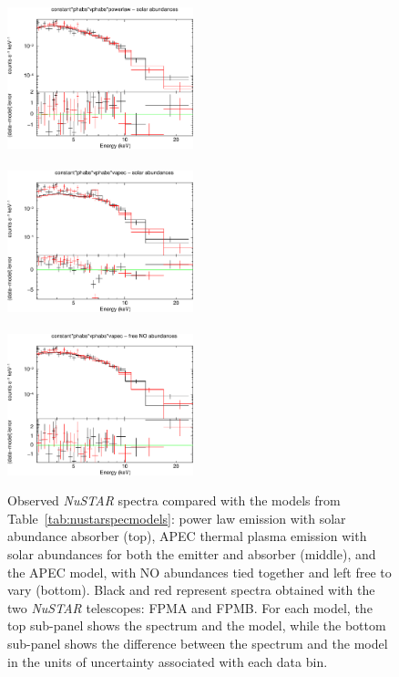 \documentclass[a4paper,fleqn,usenatbib]{mnras}
\begin{document}
%
%
\begin{figure}
\begin{center}
\includegraphics[width=0.48\textwidth,clip=true,trim=0cm 0cm 0cm 0cm,angle=0]{const_phabs_vphabs_pow__solar.eps}\\
~~\\
\includegraphics[width=0.48\textwidth,clip=true,trim=0cm 0cm 0cm 0cm,angle=0]{const_phabs_vphabs_vapec__solar.eps}\\
~~\\
\includegraphics[width=0.48\textwidth,clip=true,trim=0cm 0cm 0cm 0cm,angle=0]{const_phabs_vphabs_vapec__freeNO.eps}
\end{center}
\caption{Observed {\em NuSTAR} spectra compared with the models from 
Table~\ref{tab:nustarspecmodels}: 
power law emission with solar abundance absorber (top), 
\textsc{APEC} thermal plasma emission with solar abundances for both the
emitter and absorber (middle), 
and the \textsc{APEC} model, with NO abundances tied together and left free to vary (bottom). 
Black and red represent spectra obtained with the two {\em NuSTAR}
telescopes: FPMA and FPMB. For each model, the top sub-panel shows the spectrum and the model, while
the bottom sub-panel shows the difference between the spectrum and the model in
the units of uncertainty associated with each data bin.}
\label{fig:nuspec}
\end{figure}
%
\end{document}
